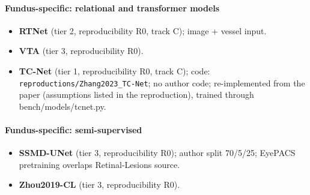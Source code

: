 \paragraph{Fundus-specific: relational and transformer models}
\begin{itemize}[leftmargin=*,itemsep=1pt]
\item \textbf{RTNet} (tier 2, reproducibility R0, track C); image + vessel input.
\item \textbf{VTA} (tier 3, reproducibility R0).
\item \textbf{TC-Net} (tier 1, reproducibility R0, track C); code: \texttt{reproductions/Zhang2023\_TC-Net}; no author code; re-implemented from the paper (assumptions listed in the reproduction), trained through bench/models/tcnet.py.
\end{itemize}
\paragraph{Fundus-specific: semi-supervised}
\begin{itemize}[leftmargin=*,itemsep=1pt]
\item \textbf{SSMD-UNet} (tier 3, reproducibility R0); author split 70/5/25; EyePACS pretraining overlaps Retinal-Lesions source.
\item \textbf{Zhou2019-CL} (tier 3, reproducibility R0).
\end{itemize}
